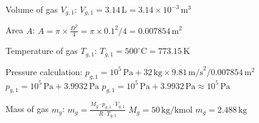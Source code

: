 Volume of gas \( V_{g,1} \):  
\( V_{g,1} = 3.14 \, \text{L} = 3.14 \times 10^{-3} \, \text{m}^3 \)  

Area \( A \):  
\( A = \pi \times \frac{D^2}{4} = \pi \times 0.1^2 / 4 = 0.007854 \, \text{m}^2 \)  

Temperature of gas \( T_{g,1} \):  
\( T_{g,1} = 500^\circ \text{C} = 773.15 \, \text{K} \)  

Pressure calculation:  
\( p_{g,1} = 10^5 \, \text{Pa} + 32 \, \text{kg} \times 9.81 \, \text{m/s}^2 / 0.007854 \, \text{m}^2 \)  
\( p_{g,1} = 10^5 \, \text{Pa} + 3.9932 \, \text{Pa} \)  
\( p_{g,1} = 10^5 \, \text{Pa} + 3.9932 \, \text{Pa} \approx 10^5 \, \text{Pa} \)  

Mass of gas \( m_g \):  
\( m_g = \frac{M_g \cdot p_{g,1} \cdot V_{g,1}}{R \cdot T_{g,1}} \)  
\( M_g = 50 \, \text{kg/kmol} \)  
\( m_g = 2.488 \, \text{kg} \)